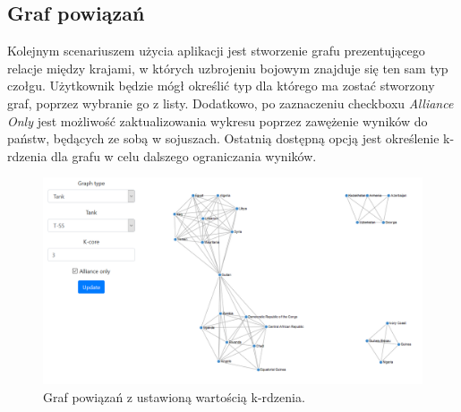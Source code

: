 \subsection{Graf powiązań}
Kolejnym scenariuszem użycia aplikacji jest stworzenie grafu prezentującego relacje między krajami, w których uzbrojeniu bojowym znajduje się ten sam typ czołgu. Użytkownik będzie mógł określić typ dla którego ma zostać stworzony graf, poprzez wybranie go z listy. Dodatkowo, po zaznaczeniu checkboxu \textit{Alliance Only} jest możliwość zaktualizowania wykresu poprzez zawężenie wyników do państw, będących ze sobą w sojuszach. Ostatnią dostępną opcją jest określenie k-rdzenia dla grafu w celu dalszego ograniczania wyników. 
\begin{figure}[H]
    \centering \includegraphics[width=1\linewidth]{tex/tank_graph.PNG}
    \caption{Graf powiązań z ustawioną wartością k-rdzenia.}
    \label{fig:owned_tanks_treshold}
\end{figure}
